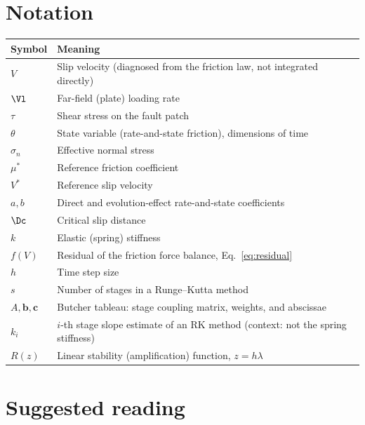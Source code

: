 \section{Notation}

\begin{center}
\begin{tabular}{@{}ll@{}}
\toprule
Symbol & Meaning \\
\midrule
$V$ & Slip velocity (diagnosed from the friction law, not integrated directly) \\
$\Vl$ & Far-field (plate) loading rate \\
$\tau$ & Shear stress on the fault patch \\
$\theta$ & State variable (rate-and-state friction), dimensions of time \\
$\sigma_n$ & Effective normal stress \\
$\mu^\ast$ & Reference friction coefficient \\
$V^\ast$ & Reference slip velocity \\
$a, b$ & Direct and evolution-effect rate-and-state coefficients \\
$\Dc$ & Critical slip distance \\
$k$ & Elastic (spring) stiffness \\
$f(V)$ & Residual of the friction force balance, Eq.~\eqref{eq:residual} \\
$h$ & Time step size \\
$s$ & Number of stages in a Runge--Kutta method \\
$A, \mathbf b, \mathbf c$ & Butcher tableau: stage coupling matrix, weights, and abscissae \\
$k_i$ & $i$-th stage slope estimate of an RK method (context: not the spring stiffness) \\
$R(z)$ & Linear stability (amplification) function, $z = h\lambda$ \\
\bottomrule
\end{tabular}
\end{center}

\section{Suggested reading}

